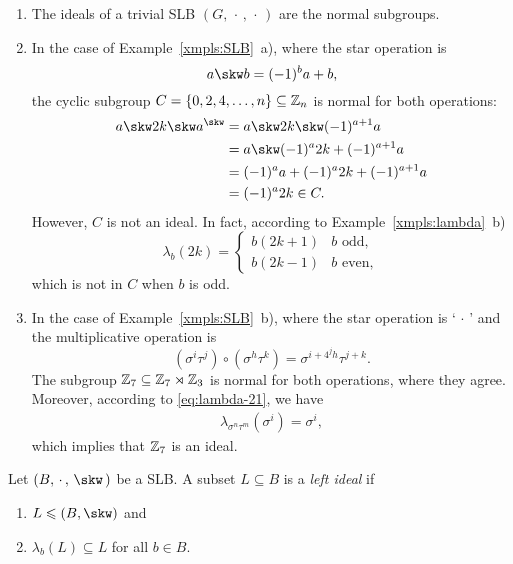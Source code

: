 \begin{xmpls}${}$
    \begin{enumerate}[\rm a)]
        \item The ideals of a trivial SLB $(G,\,\cdot\,,\,\cdot\,)$ are the normal subgroups.

        \item In the case of Example~\ref{xmpls:SLB}~a), where the star operation is
        $$
            a\skw b = (-1)^ba+b,
        $$
        the cyclic subgroup $C=\{0,2,4,\dots,n\}\subseteq\mathbb{Z}_n$ is normal for both operations:
        \begin{align*}
            a\skw2k\skw a^\skw
                &= a\skw2k\skw(-1)^{a+1}a\\
                &= a\skw(-1)^a2k+(-1)^{a+1}a\\
                &= (-1)^aa+(-1)^a2k+(-1)^{a+1}a\\
                &=(-1)^a2k\in C.
        \end{align*}
        However, $C$ is not an ideal. In fact, according to Example~\ref{xmpls:lambda}~b)
        $$
            \lambda_b(2k) = \begin{cases}
                b(2k+1)     &\text{$b$ odd},\\
                b(2k-1)     &\text{$b$ even},
            \end{cases}
        $$
        which is not in $C$ when $b$ is odd.

        \item In the case of Example~\ref{xmpls:SLB}~b), where the star operation is `$\,\cdot\,$' and the multiplicative operation is
        $$
            (\sigma^i\tau^j)\circ(\sigma^h\tau^k)
                = \sigma^{i+4^jh}\tau^{j+k}.
        $$
        The subgroup $\mathbb{Z}_7\subseteq\mathbb{Z}_7\rtimes\mathbb{Z}_3$ is normal for both operations, where they agree. Moreover, according to \eqref{eq:lambda-21}, we have
        \begin{align*}
            \lambda_{\sigma^n\tau^m}(\sigma^i)=\sigma^i,
        \end{align*}
        which implies that $\mathbb{Z}_7$ is an ideal.
    \end{enumerate}
\end{xmpls}

\begin{defn}
    Let $(B,\,\cdot\,,\,\skw\,)$ be a SLB. A subset $L\subseteq B$ is a \textsl{left ideal\/} if
    \begin{enumerate}[-]
        \item $L\subgroup(B,\skw)$ and
        \item $\lambda_b(L)\subseteq L$ for all $b\in B$.
    \end{enumerate}
\end{defn}

